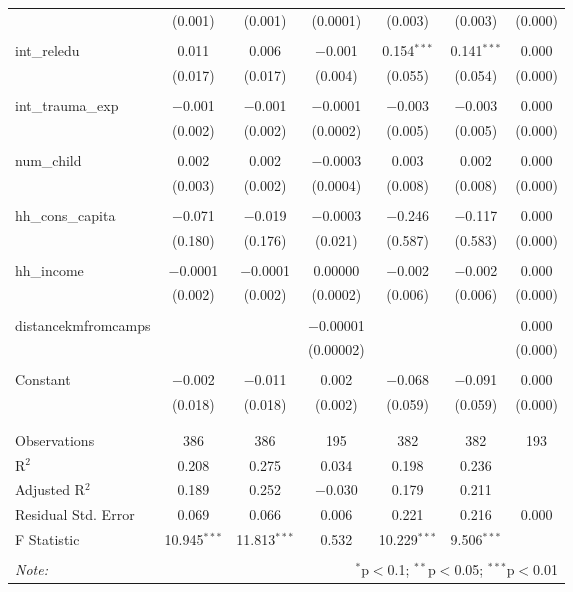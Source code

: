 \begin{table}[H]
\begin{tabular}{@{\extracolsep{4pt}}lcccccc}
  & (0.001) & (0.001) & (0.0001) & (0.003) & (0.003) & (0.000) \\ 
  & & & & & & \\ 
 int\_reledu & 0.011 & 0.006 & $-$0.001 & 0.154$^{***}$ & 0.141$^{***}$ & 0.000 \\ 
  & (0.017) & (0.017) & (0.004) & (0.055) & (0.054) & (0.000) \\ 
  & & & & & & \\ 
 int\_trauma\_exp & $-$0.001 & $-$0.001 & $-$0.0001 & $-$0.003 & $-$0.003 & 0.000 \\ 
  & (0.002) & (0.002) & (0.0002) & (0.005) & (0.005) & (0.000) \\ 
  & & & & & & \\ 
 num\_child & 0.002 & 0.002 & $-$0.0003 & 0.003 & 0.002 & 0.000 \\ 
  & (0.003) & (0.002) & (0.0004) & (0.008) & (0.008) & (0.000) \\ 
  & & & & & & \\ 
 hh\_cons\_capita & $-$0.071 & $-$0.019 & $-$0.0003 & $-$0.246 & $-$0.117 & 0.000 \\ 
  & (0.180) & (0.176) & (0.021) & (0.587) & (0.583) & (0.000) \\ 
  & & & & & & \\ 
 hh\_income & $-$0.0001 & $-$0.0001 & 0.00000 & $-$0.002 & $-$0.002 & 0.000 \\ 
  & (0.002) & (0.002) & (0.0002) & (0.006) & (0.006) & (0.000) \\ 
  & & & & & & \\ 
 distancekmfromcamps &  &  & $-$0.00001 &  &  & 0.000 \\ 
  &  &  & (0.00002) &  &  & (0.000) \\ 
  & & & & & & \\ 
 Constant & $-$0.002 & $-$0.011 & 0.002 & $-$0.068 & $-$0.091 & 0.000 \\ 
  & (0.018) & (0.018) & (0.002) & (0.059) & (0.059) & (0.000) \\ 
  & & & & & & \\ 
\hline \\[-1.8ex] 
Observations & 386 & 386 & 195 & 382 & 382 & 193 \\ 
R$^{2}$ & 0.208 & 0.275 & 0.034 & 0.198 & 0.236 &  \\ 
Adjusted R$^{2}$ & 0.189 & 0.252 & $-$0.030 & 0.179 & 0.211 &  \\ 
Residual Std. Error & 0.069 & 0.066 & 0.006 & 0.221 & 0.216 & 0.000 \\ 
F Statistic & 10.945$^{***}$ & 11.813$^{***}$ & 0.532 & 10.229$^{***}$ & 9.506$^{***}$ &  \\ 
\hline 
\hline \\[-1.8ex] 
\textit{Note:}  & \multicolumn{6}{r}{$^{*}$p$<$0.1; $^{**}$p$<$0.05; $^{***}$p$<$0.01} \\ 
\end{tabular} 
\end{table} 

